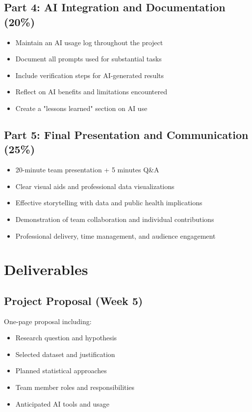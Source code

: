 \documentclass[11pt]{article}
\begin{document}
\subsection{Part 4: AI Integration and Documentation (20\%)}
\begin{itemize}
\item Maintain an AI usage log throughout the project
\item Document all prompts used for substantial tasks
\item Include verification steps for AI-generated results
\item Reflect on AI benefits and limitations encountered
\item Create a "lessons learned" section on AI use
\end{itemize}

\subsection{Part 5: Final Presentation and Communication (25\%)}
\begin{itemize}
\item 20-minute team presentation + 5 minutes Q\&A
\item Clear visual aids and professional data visualizations
\item Effective storytelling with data and public health implications
\item Demonstration of team collaboration and individual contributions
\item Professional delivery, time management, and audience engagement
\end{itemize}

\section{Deliverables}

\subsection{Project Proposal (Week 5)}
One-page proposal including:
\begin{itemize}
\item Research question and hypothesis
\item Selected dataset and justification
\item Planned statistical approaches
\item Team member roles and responsibilities
\item Anticipated AI tools and usage
\end{itemize}
\end{document}
